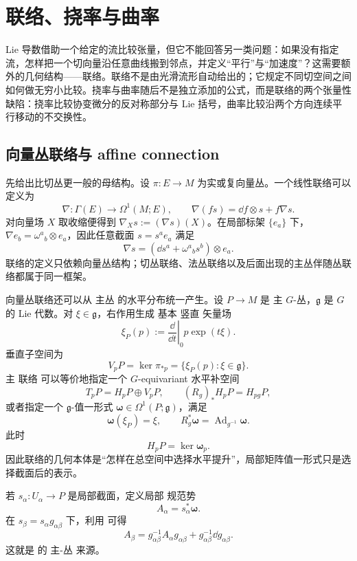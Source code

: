 \chapter{联络、挠率与曲率}
\label{chap:ghs-manifold-connection}
\label{chap:ghs-geometry-foliation}

Lie 导数借助一个给定的流比较张量，但它不能回答另一类问题：如果没有指定流，怎样把一个切向量沿任意曲线搬到邻点，并定义“平行”与“加速度”？这需要额外的几何结构——联络。联络不是由光滑流形自动给出的；它规定不同切空间之间如何做无穷小比较。挠率与曲率随后不是独立添加的公式，而是联络的两个张量性缺陷：挠率比较协变微分的反对称部分与 Lie 括号，曲率比较沿两个方向连续平行移动的不交换性。

\section{向量丛联络与 affine connection}
先给出比切丛更一般的母结构。设 $\pi:E\to M$ 为实或复向量丛。一个线性联络可以定义为
\begin{equation*}\nabla:\Gamma(E)\longrightarrow\Omega^1(M;E),
\qquad
\nabla(fs)=\dd f\otimes s+f\nabla s.
\end{equation*}
对向量场 $X$ 取收缩便得到 $\nabla_Xs:=(\nabla s)(X)$。在局部标架 $\{e_a\}$ 下，$\nabla e_b=\omega^a{}_b\otimes e_a$，因此任意截面 $s=s^ae_a$ 满足
\[
\nabla s=(\dd s^a+\omega^a{}_b s^b)\otimes e_a.
\]
联络的定义只依赖向量丛结构；切丛联络、法丛联络以及后面出现的主丛伴随丛联络都属于同一框架。

向量丛联络还可以从 主丛 的水平分布统一产生。设 $P\to M$ 是 主 $G$-丛，$\mathfrak g$ 是 $G$ 的 Lie 代数。对 $\xi\in\mathfrak g$，右作用生成 基本 竖直 矢量场
\[
\xi_P(p)
:=\left.\frac{\dd}{\dd t}\right|_0p\exp(t\xi).
\]
垂直子空间为
\[
V_pP=\ker\pi_{*p}
=\{\xi_P(p):\xi\in\mathfrak g\}.
\]
主 联络 可以等价地指定一个 $G$-equivariant 水平补空间
\begin{equation*}T_pP=H_pP\oplus V_pP,
\qquad
(R_g)_*H_pP=H_{pg}P,\end{equation*}
或者指定一个 $\mathfrak g$-值一形式 $\boldsymbol\omega\in\Omega^1(P;\mathfrak g)$，满足
\begin{equation}
\boldsymbol\omega(\xi_P)=\xi,
\qquad
R_g^*\boldsymbol\omega
=\operatorname{Ad}_{g^{-1}}\boldsymbol\omega.
\label{eq:principal-connection-form}
\end{equation}
此时
\[
H_pP=\ker\boldsymbol\omega_p.
\]
因此联络的几何本体是“怎样在总空间中选择水平提升”，局部矩阵值一形式只是选择截面后的表示。

若 $s_\alpha:U_\alpha\to P$ 是局部截面，定义局部 规范势
\[
A_\alpha=s_\alpha^*\boldsymbol\omega.
\]
在 $s_\beta=s_\alpha g_{\alpha\beta}$ 下，利用 可得
\begin{equation}
A_\beta
=g_{\alpha\beta}^{-1}A_\alpha g_{\alpha\beta}
+g_{\alpha\beta}^{-1}\dd g_{\alpha\beta}.
\label{eq:principal-local-connection-transform}
\end{equation}
这就是 的 主-丛 来源。

